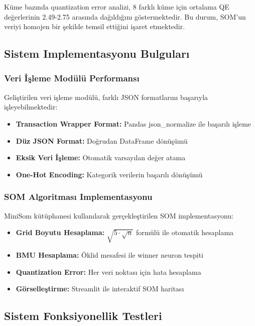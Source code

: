 Küme bazında quantization error analizi, 8 farklı küme için ortalama QE değerlerinin 2.49-2.75 arasında dağıldığını göstermektedir. Bu durum, SOM'un veriyi homojen bir şekilde temsil ettiğini işaret etmektedir.

\subsection{Sistem Implementasyonu Bulguları}

\subsubsection{Veri İşleme Modülü Performansı}

Geliştirilen veri işleme modülü, farklı JSON formatlarını başarıyla işleyebilmektedir:

\begin{itemize}
    \item \textbf{Transaction Wrapper Format:} Pandas json\_normalize ile başarılı işleme
    \item \textbf{Düz JSON Format:} Doğrudan DataFrame dönüşümü
    \item \textbf{Eksik Veri İşleme:} Otomatik varsayılan değer atama
    \item \textbf{One-Hot Encoding:} Kategorik verilerin başarılı dönüşümü
\end{itemize}

\subsubsection{SOM Algoritması Implementasyonu}

MiniSom kütüphanesi kullanılarak gerçekleştirilen SOM implementasyonu:

\begin{itemize}
    \item \textbf{Grid Boyutu Hesaplama:} $\sqrt{5 \cdot \sqrt{n}}$ formülü ile otomatik hesaplama
    \item \textbf{BMU Hesaplama:} Öklid mesafesi ile winner neuron tespiti
    \item \textbf{Quantization Error:} Her veri noktası için hata hesaplama
    \item \textbf{Görselleştirme:} Streamlit ile interaktif SOM haritası
\end{itemize}

\newpage

\subsection{Sistem Fonksiyonellik Testleri}


